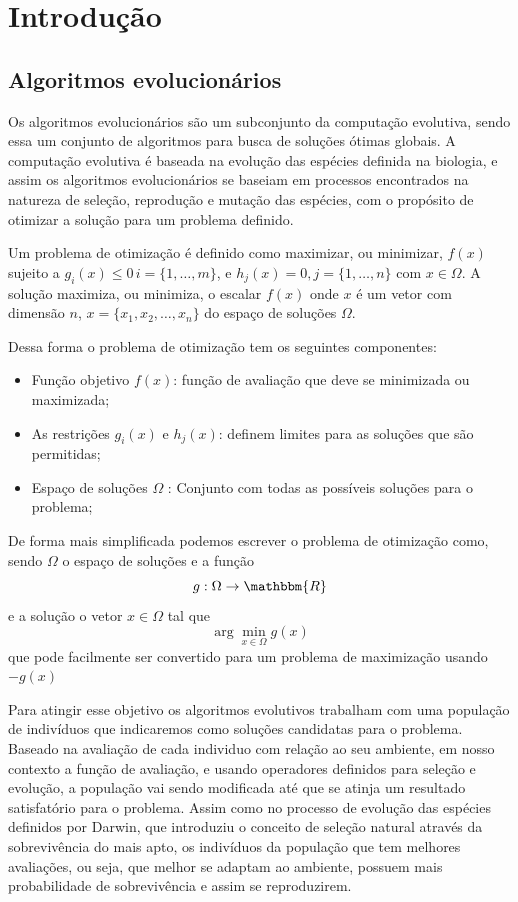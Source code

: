 %
\chapter{Introdução}

\section{Algoritmos evolucionários}

Os algoritmos evolucionários são um subconjunto da computação evolutiva, sendo essa um conjunto de algoritmos para busca de soluções ótimas globais. A computação evolutiva é baseada na evolução das espécies definida na biologia, e assim os algoritmos evolucionários se baseiam em processos encontrados na natureza de seleção, reprodução e mutação das espécies, com o propósito de otimizar a solução para um problema definido.

Um problema de otimização é definido como maximizar, ou minimizar, $f(x)$ sujeito a \(g_i(x) \leq 0\,i = \{1,\ldots, m\}\), e \(h_j(x) = 0, j=\{1,\ldots,n\}\) com \(x \in \Omega \). A solução maximiza, ou minimiza, o escalar \(f(x)\) onde \(x\) é um vetor com dimensão \(n\), \(x=\{x_1,x_2,\ldots,x_n\}\) do espaço de soluções \(\Omega\). \cite{Coello2007} 

Dessa forma o problema de otimização tem os seguintes componentes:
\begin{itemize}
	\item Função objetivo \(f(x)\): função de avaliação que deve se minimizada ou maximizada;
	\item As restrições \(g_i(x)\) e \(h_j(x)\): definem limites para as soluções que são permitidas;
	\item Espaço de soluções \(\Omega\) :
		Conjunto com todas as possíveis soluções para o problema; 
\end{itemize}

De forma mais simplificada podemos escrever o problema de otimização como, sendo \(\Omega\) o espaço de soluções e a função \[ g: \Omega \to \mathbbm{R}\] e a solução o vetor \(x \in \Omega\) tal que \[ \arg \min \limits_{x \in \Omega} g(x)\] que pode facilmente ser convertido para um problema de maximização usando \(-g(x)\)

Para atingir esse objetivo os algoritmos evolutivos trabalham com uma população de indivíduos que indicaremos como soluções candidatas para o problema. Baseado na avaliação de cada individuo com relação ao seu ambiente, em nosso contexto a função de avaliação, e usando operadores definidos para seleção e evolução, a população vai sendo modificada até que se atinja um resultado satisfatório para o problema. Assim como no processo de evolução das espécies definidos por Darwin, que introduziu o conceito de seleção natural  através da sobrevivência do mais apto, os indivíduos da população que tem melhores avaliações, ou seja, que melhor se adaptam ao ambiente, possuem mais probabilidade de sobrevivência e assim se reproduzirem. 

